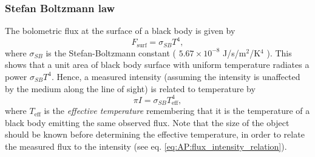 \subsubsection{Stefan Boltzmann law}
The bolometric flux at the surface of a black body is given by
%
\begin{equation}
	F_\text{surf} = \sigma_{SB} T^4,
	\label{eq:AP:stefan_boltzmann_law}
\end{equation}
%
where \( \sigma_{SB} \) is the Stefan-Boltzmann constant ( \( 5.67 \times 10^{-8} \) J/s/m\( ^2 \)/K\( ^4 \) ).
 This shows that a unit area of black body surface with uniform temperature radiates a power \( \sigma_{SB} T^4 \).
 Hence, a measured intensity (assuming the intensity is unaffected by the medium along the line of sight) is related to temperature by
%
\begin{equation}
	\pi I = \sigma_{SB} T_\text{eff}^4,
	\label{eq:AP:effective_temperature}
\end{equation}
%
where \( T_\text{eff} \) is the \textit{effective temperature} remembering that it is the temperature of a black body emitting the same observed flux.
 Note that the size of the object should be known before determining the effective temperature, in order to relate the measured flux to the intensity (see eq. \ref{eq:AP:flux_intensity_relation}).





